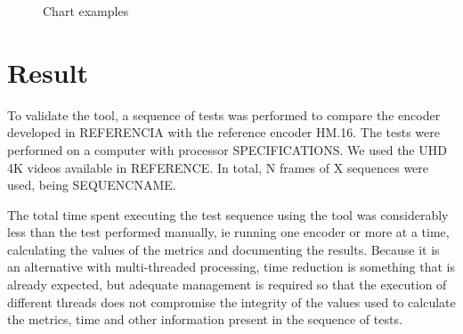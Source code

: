 \documentclass{acm_proc_article-sp}
\begin{document}
\FloatBarrier
\begin{figure}[!htb]
	\centering
	\quad %
	\caption{Chart examples}
	\label{fig01}
\end{figure}
\FloatBarrier

	


\section{Result}

To validate the tool, a sequence of tests was performed to compare the encoder developed in REFERENCIA with the reference encoder HM.16. The tests were performed on a computer with processor SPECIFICATIONS. We used the UHD 4K videos available in REFERENCE. In total, N frames of X sequences were used, being SEQUENCNAME.


The total time spent executing the test sequence using the tool was considerably less than the test performed manually, ie running one encoder or more at a time, calculating the values of the metrics and documenting the results. Because it is an alternative with multi-threaded processing, time reduction is something that is already expected, but adequate management is required so that the execution of different threads does not compromise the integrity of the values used to calculate the metrics, time and other information present in the sequence of tests.

\pagebreak





\end{document}
